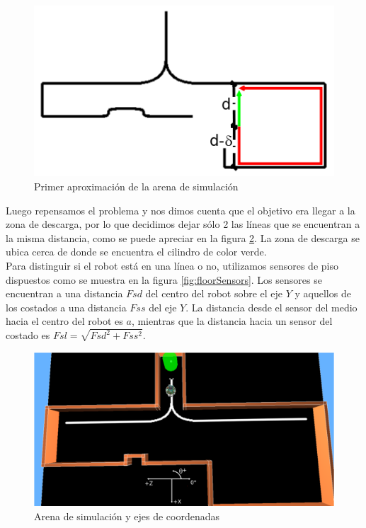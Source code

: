\begin{figure}[htp]
\begin{center}
\includegraphics[scale=0.85]{comportamientos/figures/arenawithalllinesRotatedUse.png}
\caption{Primer aproximaci\'on de la arena de simulaci\'on}
\label{fig:arenainicial}
\end{center}
\end{figure}

Luego repensamos el problema y nos dimos cuenta que el objetivo era llegar a la
zona de descarga, por lo que decidimos dejar s\'olo 2 las l\'ineas que se
encuentran a la misma distancia, como se puede apreciar en la figura
\ref{fig:arenafinal}. La zona de descarga se ubica cerca de donde se encuentra
el cilindro de color verde.
\\\indent
Para distinguir si el robot est\'a en una l\'inea o no, utilizamos sensores de
piso dispuestos como se muestra en la figura \ref{fig:floorSensors}. Los
sensores se encuentran a una distancia $Fsd$ del centro del robot sobre el eje
$Y$ y aquellos de los costados a una distancia $Fss$ del eje $Y$. La distancia
desde el sensor del medio hacia el centro del robot es $a$, mientras que la
distancia hacia un sensor del costado es $Fsl = \sqrt{Fsd^2 + Fss^2}$.

\begin{figure}[htp]
\begin{center}
\includegraphics[scale=0.3]{comportamientos/figures/arenafinal.png}
\caption{Arena de simulaci\'on y ejes de coordenadas}
\label{fig:arenafinal}
\end{center}
\end{figure}

